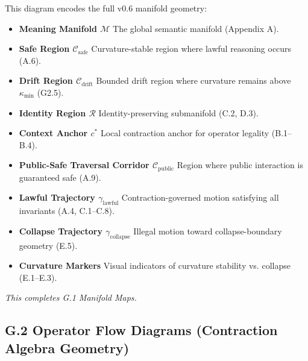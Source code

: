 \medskip

\noindent
This diagram encodes the full v0.6 manifold geometry:

\begin{itemize}
    \item \textbf{Meaning Manifold $\mathcal{M}$}  
    The global semantic manifold (Appendix A).

    \item \textbf{Safe Region $\mathcal{C}_{\mathrm{safe}}$}  
    Curvature-stable region where lawful reasoning occurs (A.6).

    \item \textbf{Drift Region $\mathcal{C}_{\mathrm{drift}}$}  
    Bounded drift region where curvature remains above $\kappa_{\min}$ (G2.5).

    \item \textbf{Identity Region $\mathcal{R}$}  
    Identity-preserving submanifold (C.2, D.3).

    \item \textbf{Context Anchor $c^*$}  
    Local contraction anchor for operator legality (B.1–B.4).

    \item \textbf{Public-Safe Traversal Corridor $\mathcal{C}_{\mathrm{public}}$}  
    Region where public interaction is guaranteed safe (A.9).

    \item \textbf{Lawful Trajectory $\gamma_{\mathrm{lawful}}$}  
    Contraction-governed motion satisfying all invariants (A.4, C.1–C.8).

    \item \textbf{Collapse Trajectory $\gamma_{\mathrm{collapse}}$}  
    Illegal motion toward collapse-boundary geometry (E.5).

    \item \textbf{Curvature Markers}  
    Visual indicators of curvature stability vs. collapse (E.1–E.3).
\end{itemize}

\medskip

\noindent
\textit{This completes G.1 Manifold Maps.}



\subsection*{G.2 Operator Flow Diagrams (Contraction Algebra Geometry)}

